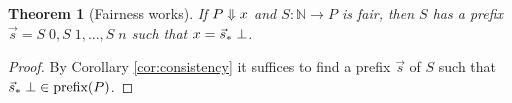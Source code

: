 \documentclass{article}
\newcommand{\N}{\mathbb{N}}
\newcommand{\todo}[1]{{\color{red}{#1}}}
\newtheorem{theorem}{Theorem}
\begin{document}
\begin{theorem}[Fairness works]
  If $P \Downarrow x$ and $S : \N \to P$ is fair, then $S$ has a prefix $\vec{s} =
  S\;0, S\;1, ..., S\;n$ such that $x = {\vec{s}_*}\;\bot$.
\end{theorem}
\begin{proof}
  By Corollary \ref{cor:consistency} it suffices to find a prefix $\vec{s}$ of
  $S$ such that ${\vec{s}_*}\;\bot \in \text{prefix}(P)$.

\todo{TODO}
\end{proof}
\end{document}

